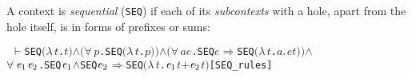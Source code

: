 \documentclass[GCNS]{yincog}
\renewcommand{\HOLinline}[1]{\mbox{\textup{\texttt{#1}}}}
\renewcommand{\HOLConst}[1]{\texttt{#1}}
\renewcommand{\HOLBoundVar}[1]{\ensuremath{\mathit{#1}}}
\renewcommand{\HOLSymConst}[1]{#1}
\renewcommand{\HOLTokenConj}{\ensuremath{\wedge}}
\renewcommand{\HOLTokenForall}{\ensuremath{\forall \,}}
\renewcommand{\HOLTokenLambda}{\ensuremath{\lambda \,}}
\renewcommand{\HOLTokenTurnstile}{\ensuremath{\:\:\vdash}}
\theoremstyle{remark}
\theoremstyle{theorem}
\theoremstyle{remark}
\renewcommand{\HOLTokenImp}{\ensuremath{\Longrightarrow}}
\begin{document}
A context is \emph{sequential} (\HOLinline{\HOLConst{SEQ}}) if each of its
\emph{subcontexts} with a hole, apart from the hole itself, is in forms
of prefixes or sums:
%
\begin{alltt}
\HOLTokenTurnstile{} \HOLConst{SEQ} \ensuremath{(}\HOLTokenLambda{}\HOLBoundVar{t}. \HOLBoundVar{t}\ensuremath{)} \HOLSymConst{\HOLTokenConj{}} \ensuremath{(}\HOLSymConst{\HOLTokenForall{}}\HOLBoundVar{p}. \HOLConst{SEQ} \ensuremath{(}\HOLTokenLambda{}\HOLBoundVar{t}. \HOLBoundVar{p}\ensuremath{)}\ensuremath{)} \HOLSymConst{\HOLTokenConj{}} \ensuremath{(}\HOLSymConst{\HOLTokenForall{}}\HOLBoundVar{a} \HOLBoundVar{e}. \HOLConst{SEQ} \HOLBoundVar{e} \HOLSymConst{\HOLTokenImp{}} \HOLConst{SEQ} \ensuremath{(}\HOLTokenLambda{}\HOLBoundVar{t}. \HOLBoundVar{a}\HOLSymConst{\ensuremath{\ldotp}}\HOLBoundVar{e} \HOLBoundVar{t}\ensuremath{)}\ensuremath{)} \HOLSymConst{\HOLTokenConj{}}
   \HOLSymConst{\HOLTokenForall{}}\ensuremath{\HOLBoundVar{e}\sb{\mathrm{1}}} \ensuremath{\HOLBoundVar{e}\sb{\mathrm{2}}}. \HOLConst{SEQ} \ensuremath{\HOLBoundVar{e}\sb{\mathrm{1}}} \HOLSymConst{\HOLTokenConj{}} \HOLConst{SEQ} \ensuremath{\HOLBoundVar{e}\sb{\mathrm{2}}} \HOLSymConst{\HOLTokenImp{}} \HOLConst{SEQ} \ensuremath{(}\HOLTokenLambda{}\HOLBoundVar{t}. \ensuremath{\HOLBoundVar{e}\sb{\mathrm{1}}} \HOLBoundVar{t} \HOLSymConst{\ensuremath{+}} \ensuremath{\HOLBoundVar{e}\sb{\mathrm{2}}} \HOLBoundVar{t}\ensuremath{)}\hfill{[SEQ\_rules]}
\end{alltt}
\end{document}
